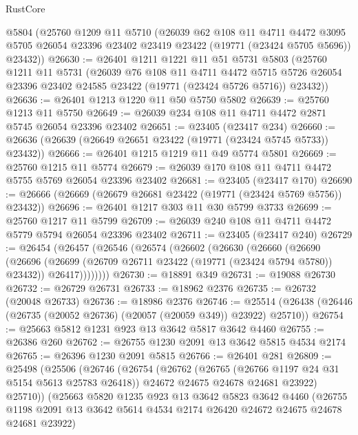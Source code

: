 \begin{lexlean}{RustCore}
\begin{coremodule}
    @5804
    (@25760
      @1209
      @11
      @5710
      (@26039
        @62
        @108
        @11
        @4711
        @4472
        @3095
        @5705
        @26054
        @23396
        @23402
        @23419
        @23422
        (@19771 (@23424 @5705 @5696))
        @23432))
@26630 := @26401
    @1211
    @1221
    @11
    @51
    @5731
    @5803
    (@25760
      @1211
      @11
      @5731
      (@26039
        @76
        @108
        @11
        @4711
        @4472
        @5715
        @5726
        @26054
        @23396
        @23402
        @24585
        @23422
        (@19771 (@23424 @5726 @5716))
        @23432))
@26636 := @26401 @1213 @1220 @11 @50 @5750 @5802
@26639 := @25760 @1213 @11 @5750
@26649 := @26039 @234 @108 @11 @4711 @4472 @2871 @5745 @26054 @23396 @23402
@26651 := @23405 (@23417 @234)
@26660 := @26636 (@26639 (@26649 @26651 @23422 (@19771 (@23424 @5745 @5733)) @23432))
@26666 := @26401 @1215 @1219 @11 @49 @5774 @5801
@26669 := @25760 @1215 @11 @5774
@26679 := @26039 @170 @108 @11 @4711 @4472 @5755 @5769 @26054 @23396 @23402
@26681 := @23405 (@23417 @170)
@26690 := @26666 (@26669 (@26679 @26681 @23422 (@19771 (@23424 @5769 @5756)) @23432))
@26696 := @26401 @1217 @303 @11 @30 @5799 @3733
@26699 := @25760 @1217 @11 @5799
@26709 := @26039 @240 @108 @11 @4711 @4472 @5779 @5794 @26054 @23396 @23402
@26711 := @23405 (@23417 @240)
@26729 := @26454
    (@26457
      (@26546
        (@26574
          (@26602
            (@26630
              (@26660
                (@26690
                  (@26696
                    (@26699 (@26709 @26711 @23422 (@19771 (@23424 @5794 @5780)) @23432))
                    @26417))))))))
@26730 := @18891 @349
@26731 := @19088 @26730
@26732 := @26729 @26731
@26733 := @18962 @2376
@26735 := @26732 (@20048 @26733)
@26736 := @18986 @2376
@26746 := @25514 (@26438 (@26446 (@26735 (@20052 @26736) (@20057 (@20059 @349)) @23922) @25710))
@26754 := @25663 @5812 @1231 @923 @13 @3642 @5817 @3642 @4460
@26755 := @26386 @260
@26762 := @26755 @1230 @2091 @13 @3642 @5815 @4534 @2174
@26765 := @26396 @1230 @2091 @5815
@26766 := @26401 @281
@26809 := @25498
    (@25506
      (@26746
        (@26754
          (@26762
            (@26765 (@26766 @1197 @24 @31 @5154 @5613 @25783 @26418))
            @24672
            @24675
            @24678
            @24681
            @23922)
          @25710))
      (@25663
        @5820
        @1235
        @923
        @13
        @3642
        @5823
        @3642
        @4460
        (@26755 @1198 @2091 @13 @3642 @5614 @4534 @2174 @26420 @24672 @24675 @24678 @24681 @23922)

\end{coremodule}
\end{lexlean}

